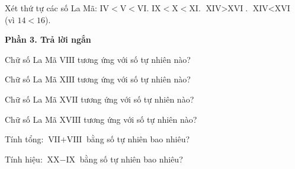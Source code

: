 \begin{ex} %
Xét thứ tự các số La Mã:
\choiceTF
{\True $\text{IV} < \text{V} < \text{VI}$.}
{\True $\text{IX} < \text{X} < \text{XI}$.}
{$\text{XIV} > \text{XVI}$.}
{\True $\text{XIV} < \text{XVI}$ (vì $14 < 16$).}
\end{ex}

\textbf{Phần 3. Trả lời ngắn}

\begin{ex} %
Chữ số La Mã $\text{VIII}$ tương ứng với số tự nhiên nào?
\end{ex}

\begin{ex} %
Chữ số La Mã $\text{XIII}$ tương ứng với số tự nhiên nào?
\end{ex}

\begin{ex} %
Chữ số La Mã $\text{XVII}$ tương ứng với số tự nhiên nào?
\end{ex}

\begin{ex} %
Chữ số La Mã $\text{XVIII}$ tương ứng với số tự nhiên nào?
\end{ex}

\begin{ex} %
Tính tổng: $\text{VII} + \text{VIII}$ bằng số tự nhiên bao nhiêu?
\end{ex}

\begin{ex} %
Tính hiệu: $\text{XX} - \text{IX}$ bằng số tự nhiên bao nhiêu?
\end{ex}
